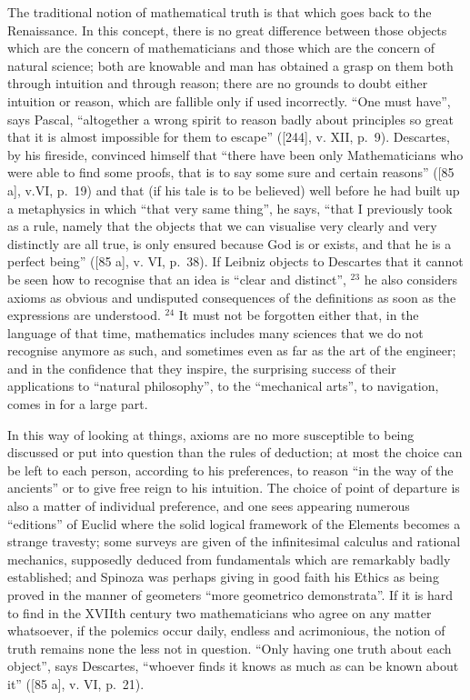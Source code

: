 The traditional notion of mathematical truth is that which goes back to the Renaissance. In this concept, there is no great difference between those objects which are the concern of mathematicians and those which are the concern of natural science; both are knowable and man has obtained a grasp on them both through intuition and through reason; there are no grounds to doubt either intuition or reason, which are fallible only if used incorrectly. ``One must have'', says Pascal, ``altogether a wrong spirit to reason badly about principles so great that it is almost impossible for them to escape'' ({[}244{]}, v. XII, p.~9). Descartes, by his fireside, convinced himself that ``there have been only Mathematicians who were able to find some proofs, that is to say some sure and certain reasons'' ({[}85 a{]}, v.VI, p.~19) and that (if his tale is to be believed) well before he had built up a metaphysics in which ``that very same thing'', he says, ``that I previously took as a rule, namely that the objects that we can visualise very clearly and very distinctly are all true, is only ensured because God is or exists, and that he is a perfect being'' ({[}85 a{]}, v. VI, p.~38). If Leibniz objects to Descartes that it cannot be seen how to recognise that an idea is ``clear and distinct'', \(^{23}\) he also considers axioms as obvious and undisputed consequences of the definitions as soon as the expressions are understood. \(^{24}\) It must not be forgotten either that, in the language of that time, mathematics includes many sciences that we do not recognise anymore as such, and sometimes even as far as the art of the engineer; and in the confidence that they inspire, the surprising success of their applications to ``natural philosophy'', to the ``mechanical arts'', to navigation, comes in for a large part.

In this way of looking at things, axioms are no more susceptible to being discussed or put into question than the rules of deduction; at most the choice can be left to each person, according to his preferences, to reason ``in the way of the ancients'' or to give free reign to his intuition. The choice of point of departure is also a matter of individual preference, and one sees appearing numerous ``editions'' of Euclid where the solid logical framework of the Elements becomes a strange travesty; some surveys are given of the infinitesimal calculus and rational mechanics, supposedly deduced from fundamentals which are remarkably badly established; and Spinoza was perhaps giving in good faith his Ethics as being proved in the manner of geometers ``more geometrico demonstrata''. If it is hard to find in the XVIIth century two mathematicians who agree on any matter whatsoever, if the polemics occur daily, endless and acrimonious, the notion of truth remains none the less not in question. ``Only having one truth about each object'', says Descartes, ``whoever finds it knows as much as can be known about it'' ({[}85 a{]}, v. VI, p.~21).

